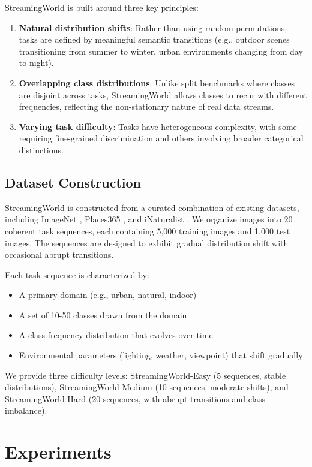\documentclass[11pt]{article}
\begin{document}
StreamingWorld is built around three key principles:
\begin{enumerate}
    \item \textbf{Natural distribution shifts}: Rather than using random permutations, tasks are defined by meaningful semantic transitions (e.g., outdoor scenes transitioning from summer to winter, urban environments changing from day to night).
    \item \textbf{Overlapping class distributions}: Unlike split benchmarks where classes are disjoint across tasks, StreamingWorld allows classes to recur with different frequencies, reflecting the non-stationary nature of real data streams.
    \item \textbf{Varying task difficulty}: Tasks have heterogeneous complexity, with some requiring fine-grained discrimination and others involving broader categorical distinctions.
\end{enumerate}

\subsection{Dataset Construction}

StreamingWorld is constructed from a curated combination of existing datasets, including ImageNet \citep{deng2009imagenet}, Places365 \citep{zhou2017places}, and iNaturalist \citep{van2018inaturalist}. We organize images into 20 coherent task sequences, each containing 5,000 training images and 1,000 test images. The sequences are designed to exhibit gradual distribution shift with occasional abrupt transitions.

Each task sequence is characterized by:
\begin{itemize}
    \item A primary domain (e.g., urban, natural, indoor)
    \item A set of 10-50 classes drawn from the domain
    \item A class frequency distribution that evolves over time
    \item Environmental parameters (lighting, weather, viewpoint) that shift gradually
\end{itemize}

We provide three difficulty levels: StreamingWorld-Easy (5 sequences, stable distributions), StreamingWorld-Medium (10 sequences, moderate shifts), and StreamingWorld-Hard (20 sequences, with abrupt transitions and class imbalance).

\section{Experiments}
\label{sec:experiments}
\end{document}
